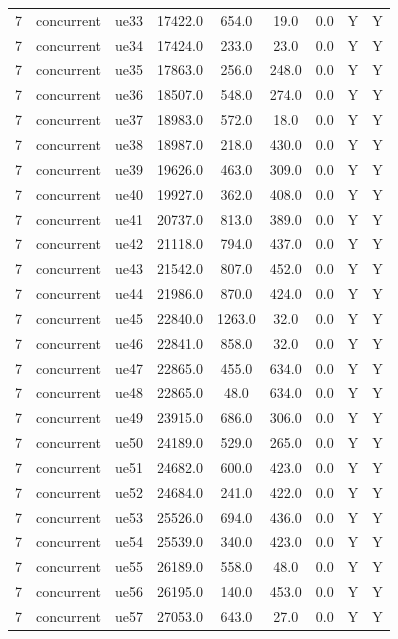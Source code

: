 \begin{table}[ht]
\begin{tabular}{|c|c|c|c|c|c|c|c|c|}
7 & concurrent & ue33 & 17422.0 & 654.0 & 19.0 & 0.0 & Y & Y \\
7 & concurrent & ue34 & 17424.0 & 233.0 & 23.0 & 0.0 & Y & Y \\
7 & concurrent & ue35 & 17863.0 & 256.0 & 248.0 & 0.0 & Y & Y \\
7 & concurrent & ue36 & 18507.0 & 548.0 & 274.0 & 0.0 & Y & Y \\
7 & concurrent & ue37 & 18983.0 & 572.0 & 18.0 & 0.0 & Y & Y \\
7 & concurrent & ue38 & 18987.0 & 218.0 & 430.0 & 0.0 & Y & Y \\
7 & concurrent & ue39 & 19626.0 & 463.0 & 309.0 & 0.0 & Y & Y \\
7 & concurrent & ue40 & 19927.0 & 362.0 & 408.0 & 0.0 & Y & Y \\
7 & concurrent & ue41 & 20737.0 & 813.0 & 389.0 & 0.0 & Y & Y \\
7 & concurrent & ue42 & 21118.0 & 794.0 & 437.0 & 0.0 & Y & Y \\
7 & concurrent & ue43 & 21542.0 & 807.0 & 452.0 & 0.0 & Y & Y \\
7 & concurrent & ue44 & 21986.0 & 870.0 & 424.0 & 0.0 & Y & Y \\
7 & concurrent & ue45 & 22840.0 & 1263.0 & 32.0 & 0.0 & Y & Y \\
7 & concurrent & ue46 & 22841.0 & 858.0 & 32.0 & 0.0 & Y & Y \\
7 & concurrent & ue47 & 22865.0 & 455.0 & 634.0 & 0.0 & Y & Y \\
7 & concurrent & ue48 & 22865.0 & 48.0 & 634.0 & 0.0 & Y & Y \\
7 & concurrent & ue49 & 23915.0 & 686.0 & 306.0 & 0.0 & Y & Y \\
7 & concurrent & ue50 & 24189.0 & 529.0 & 265.0 & 0.0 & Y & Y \\
7 & concurrent & ue51 & 24682.0 & 600.0 & 423.0 & 0.0 & Y & Y \\
7 & concurrent & ue52 & 24684.0 & 241.0 & 422.0 & 0.0 & Y & Y \\
7 & concurrent & ue53 & 25526.0 & 694.0 & 436.0 & 0.0 & Y & Y \\
7 & concurrent & ue54 & 25539.0 & 340.0 & 423.0 & 0.0 & Y & Y \\
7 & concurrent & ue55 & 26189.0 & 558.0 & 48.0 & 0.0 & Y & Y \\
7 & concurrent & ue56 & 26195.0 & 140.0 & 453.0 & 0.0 & Y & Y \\
7 & concurrent & ue57 & 27053.0 & 643.0 & 27.0 & 0.0 & Y & Y \\

\end{tabular}
\end{table}
